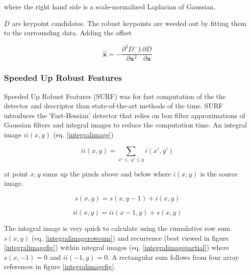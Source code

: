\documentclass[english,12pt,a4paper,pdftex,elec,utf8]{aaltothesis}
\begin{document}
where the right hand side is a scale-normalized Laplacian of Gaussian.

$D$ are keypoint candidates. The robust keypoints are weeded out by fitting them to the surrounding data. \cite{Lowe2004} Adding the offset

\begin{equation}\label{keypointoffset}
\hat{\boldsymbol{x}} = - \frac{\partial^2D^-1}{\partial \boldsymbol{x}^2}\frac{\partial D}{\partial \boldsymbol{x}}
\end{equation}\cite{Lowe2004}

\subsubsection{Speeded Up Robust Features}
Speeded Up Robust Features (SURF) was for fast computation of the the detector and descriptor than state-of-the-art methods of the time. SURF introduces the 'Fast-Hessian' detector that relies on box filter approximations of Gaussian filters and integral images to reduce the computation time. \cite{Bay2006} An integral image $ii(x,y)$ (eq. \ref{integralimage})

\begin{equation}
  \label{integralimage}
ii(x,y) = \sum\limits_{x'\le,y'\le y} i(x', y')
\end{equation}

at point $x, y$ sums up the pixels above and below where $i(x,y)$ is the source image. \cite{Viola2001}

\begin{equation}
  \label{integralimagerowsum}
s(x,y) = s(x, y - 1) + i(x,y)
\end{equation}

\begin{equation}
  \label{integralimagepartial}
  ii(x,y) = ii(x-1,y) + s(x,y)
\end{equation}

The integral image is very quick to calculate using the cumulative row sum $s(x,y)$ (eq. \ref{integralimagerowsum}) and recurrence (best viewed in figure \ref{integralimagefig}) within integral images (eq. \ref{integralimagepartial}) where $s(x, -1) = 0$ and $ii(-1,y)=0$. A rectangular sum follows from four array references in figure \ref{integralimagefig}.
\end{document}
